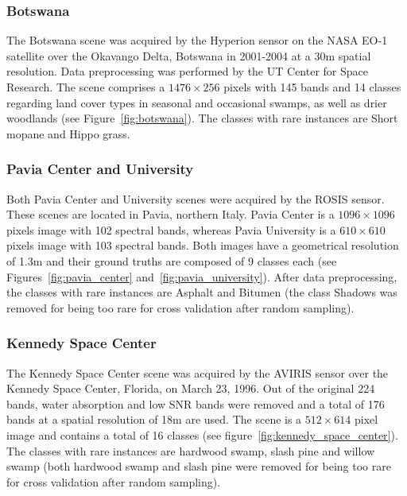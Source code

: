 \documentclass[information,article,submit,moreauthors,pdftex]{Definitions/mdpi}
\begin{document}
\begin{paracol}{2}
\linenumbers
\switchcolumn

\subsubsection*{Botswana}

The Botswana scene was acquired by the Hyperion sensor on the NASA EO-1
satellite over the Okavango Delta, Botswana in 2001-2004 at a 30m spatial
resolution. Data preprocessing was performed by the UT Center for Space
Research. The scene comprises a $1476 \times 256$ pixels with 145 bands and 14
classes regarding land cover types in seasonal and occasional swamps, as well
as drier woodlands (see Figure~\ref{fig:botswana}). The classes with
rare instances are Short mopane and Hippo grass.

\subsubsection*{Pavia Center and University}

Both Pavia Center and University scenes were acquired by the ROSIS sensor.
These scenes are located in Pavia, northern Italy. Pavia Center is a $1096
\times 1096$ pixels image with 102 spectral bands, whereas Pavia University is
a $610 \times 610$ pixels image with 103 spectral bands. Both images have a
geometrical resolution of 1.3m and their ground truths are
composed of 9 classes each (see Figures~\ref{fig:pavia_center}
and~\ref{fig:pavia_university}). After data preprocessing, the classes
with rare instances are Asphalt and Bitumen (the class Shadows was removed for
being too rare for cross validation after random sampling).

\subsubsection*{Kennedy Space Center}

The Kennedy Space Center scene was acquired by the AVIRIS sensor over the
Kennedy Space Center, Florida, on March 23, 1996. Out of the original 224
bands, water absorption and low SNR bands were removed and a total of 176
bands at a spatial resolution of 18m are used. The scene is a $512 \times 614$
pixel image and contains a total of 16 classes (see
figure~\ref{fig:kennedy_space_center}). The classes with rare instances
are hardwood swamp, slash pine and willow swamp (both hardwood swamp and slash
pine were removed for being too rare for cross validation after random
sampling).


\end{paracol}
\end{document}
